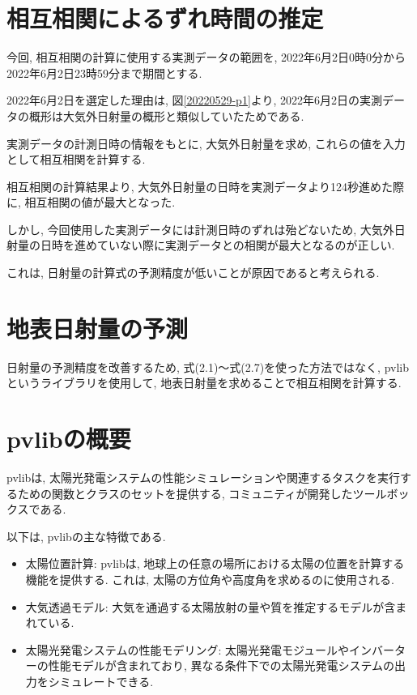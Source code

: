 
\section{相互相関によるずれ時間の推定}
今回, 相互相関の計算に使用する実測データの範囲を, 2022年6月2日0時0分から2022年6月2日23時59分まで期間とする.

2022年6月2日を選定した理由は, 図\ref{20220529-p1}より, 2022年6月2日の実測データの概形は大気外日射量の概形と類似していたためである.

実測データの計測日時の情報をもとに, 大気外日射量を求め, これらの値を入力として相互相関を計算する.

相互相関の計算結果より, 大気外日射量の日時を実測データより124秒進めた際に, 相互相関の値が最大となった.

しかし, 今回使用した実測データには計測日時のずれは殆どないため, 大気外日射量の日時を進めていない際に実測データとの相関が最大となるのが正しい.

これは, 日射量の計算式の予測精度が低いことが原因であると考えられる.

\section{地表日射量の予測}

日射量の予測精度を改善するため, 式(2.1)～式(2.7)を使った方法ではなく, pvlibというライブラリを使用して, 地表日射量を求めることで相互相関を計算する.

\section{pvlibの概要}
pvlibは, 太陽光発電システムの性能シミュレーションや関連するタスクを実行するための関数とクラスのセットを提供する, コミュニティが開発したツールボックスである. 

以下は, pvlibの主な特徴である.

\begin{itemize}
  \item 太陽位置計算: pvlibは, 地球上の任意の場所における太陽の位置を計算する機能を提供する. これは, 太陽の方位角や高度角を求めるのに使用される.
  \item 大気透過モデル: 大気を通過する太陽放射の量や質を推定するモデルが含まれている.
  \item 太陽光発電システムの性能モデリング: 太陽光発電モジュールやインバーターの性能モデルが含まれており, 異なる条件下での太陽光発電システムの出力をシミュレートできる.
\end{itemize}

